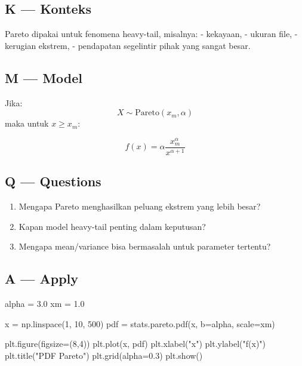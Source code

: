 \documentclass[
  letterpaper,
  DIV=11,
  numbers=noendperiod]{scrreprt}
\newenvironment{Shaded}{\begin{snugshade}}{\end{snugshade}}
\newcommand{\DecValTok}[1]{\textcolor[rgb]{0.68,0.00,0.00}{#1}}
\newcommand{\FloatTok}[1]{\textcolor[rgb]{0.68,0.00,0.00}{#1}}
\newcommand{\NormalTok}[1]{\textcolor[rgb]{0.00,0.23,0.31}{#1}}
\newcommand{\OperatorTok}[1]{\textcolor[rgb]{0.37,0.37,0.37}{#1}}
\newcommand{\StringTok}[1]{\textcolor[rgb]{0.13,0.47,0.30}{#1}}
\providecommand{\tightlist}{%
  \setlength{\itemsep}{0pt}\setlength{\parskip}{0pt}}
\begin{document}
\subsection{K --- Konteks}\label{k-konteks-26}

Pareto dipakai untuk fenomena heavy-tail, misalnya: - kekayaan, - ukuran
file, - kerugian ekstrem, - pendapatan segelintir pihak yang sangat
besar.

\subsection{M --- Model}\label{m-model-26}

Jika: \[
X \sim \text{Pareto}(x_m,\alpha)
\] maka untuk \(x \ge x_m\):

\[
f(x)=\alpha \frac{x_m^\alpha}{x^{\alpha+1}}
\]

\subsection{Q --- Questions}\label{q-questions-26}

\begin{enumerate}
\def\labelenumi{\arabic{enumi}.}
\tightlist
\item
  Mengapa Pareto menghasilkan peluang ekstrem yang lebih besar?
\item
  Kapan model heavy-tail penting dalam keputusan?
\item
  Mengapa mean/variance bisa bermasalah untuk parameter tertentu?
\end{enumerate}

\subsection{A --- Apply}\label{a-apply-26}

\begin{Shaded}
\begin{Highlighting}[]
\NormalTok{alpha }\OperatorTok{=} \FloatTok{3.0}
\NormalTok{xm }\OperatorTok{=} \FloatTok{1.0}

\NormalTok{x }\OperatorTok{=}\NormalTok{ np.linspace(}\DecValTok{1}\NormalTok{, }\DecValTok{10}\NormalTok{, }\DecValTok{500}\NormalTok{)}
\NormalTok{pdf }\OperatorTok{=}\NormalTok{ stats.pareto.pdf(x, b}\OperatorTok{=}\NormalTok{alpha, scale}\OperatorTok{=}\NormalTok{xm)}

\NormalTok{plt.figure(figsize}\OperatorTok{=}\NormalTok{(}\DecValTok{8}\NormalTok{,}\DecValTok{4}\NormalTok{))}
\NormalTok{plt.plot(x, pdf)}
\NormalTok{plt.xlabel(}\StringTok{"x"}\NormalTok{)}
\NormalTok{plt.ylabel(}\StringTok{"f(x)"}\NormalTok{)}
\NormalTok{plt.title(}\StringTok{"PDF Pareto"}\NormalTok{)}
\NormalTok{plt.grid(alpha}\OperatorTok{=}\FloatTok{0.3}\NormalTok{)}
\NormalTok{plt.show()}
\end{Highlighting}
\end{Shaded}
\end{document}
